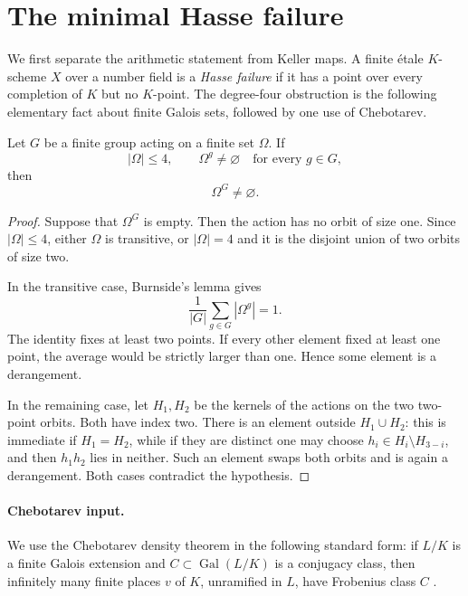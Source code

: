 \section{The minimal Hasse failure}\label{sec:hasse}

We first separate the arithmetic statement from Keller maps.  A finite
\'etale \(K\)-scheme \(X\) over a number field is a \emph{Hasse failure} if
it has a point over every completion of \(K\) but no \(K\)-point.  The
degree-four obstruction is the following elementary fact about finite
Galois sets, followed by one use of Chebotarev.

\begin{lemma}
\label{lem:degree-four-fixed-point}
Let \(G\) be a finite group acting on a finite set \(\Omega\).  If
\[
 |\Omega|\leq4,
 \qquad
 \Omega^g\neq\varnothing\quad\text{for every }g\in G,
\]
then
\[
 \boxed{\Omega^G\neq\varnothing.}
\]
\end{lemma}

\begin{proof}
Suppose that \(\Omega^G\) is empty.  Then the action has no orbit of size one.
Since \(|\Omega|\leq4\), either \(\Omega\) is transitive, or
\(|\Omega|=4\) and it is the disjoint union of two orbits of size two.

In the transitive case, Burnside's lemma gives
\[
 \frac1{|G|}\sum_{g\in G}|\Omega^g|=1.
\]
The identity fixes at least two points.  If every other element fixed at
least one point, the average would be strictly larger than one.  Hence some
element is a derangement.

In the remaining case, let \(H_1,H_2\) be the kernels of the actions on the
two two-point orbits.  Both have index two.  There is an element outside
\(H_1\cup H_2\): this is immediate if \(H_1=H_2\), while if they are
distinct one may choose
\(h_i\in H_i\setminus H_{3-i}\), and then \(h_1h_2\) lies in neither.
Such an element swaps both orbits and is again a derangement.  Both cases
contradict the hypothesis.
\end{proof}

\paragraph{Chebotarev input.}
We use the Chebotarev density theorem in the following standard form: if
\(L/K\) is a finite Galois extension and \(C\subset\operatorname{Gal}(L/K)\)
is a conjugacy class, then infinitely many finite places \(v\) of \(K\),
unramified in \(L\), have Frobenius class \(C\)
\cite[Chapter~VII, \S13]{Neukirch}.

